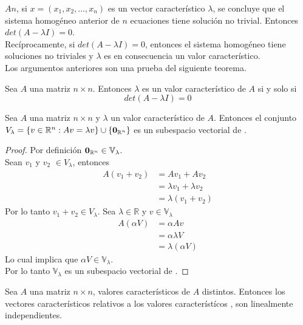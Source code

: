 \noindent $An$, si $x = (x_1 , x_2 , \ldots , x_n)$ es un vector característico $\lambda$, se concluye que el sistema homogéneo anterior de $n$ ecuaciones tiene solución no trivial. Entonces $det (A - \lambda I) = 0$.\\
Recíprocamente, si $det(A- \lambda I)=0$, entonces el sistema homogéneo tiene soluciones no triviales y $\lambda$ es en consecuencia un valor característico.\\
Los argumentos anteriores son una prueba del siguiente teorema.
\begin{theorem}
Sea $A$ una matriz $n \times n$. Entonces $\lambda$ es un valor característico de $A$ si y solo si 
$$det(A- \lambda I) =0$$
\end{theorem}


\begin{theorem}
Sea $A$ una matriz $n \times n$ y $\lambda$ un valor característico de $A$. Entonces el conjunto $V_{\lambda} = \{v \in \mathbb{R}^n : Av = \lambda v \} \cup  \{\mathbf{0}_{\mathbb{R}^n}\}$ es un subespacio vectorial de \rn .
\end{theorem}

\begin{proof}
Por definición $\mathbf{0}_{\mathbb{R}^n} \in \mathbb{V}_{\lambda}$.\\
Sean $v_1$ y $v_2$ $\in V_{\lambda}$, entonces 
\begin{align*}
A(v_1 + v_2) &= A v_1 + A v_2\\
&= \lambda v_1 + \lambda v_2\\
&= \lambda (v_1 + v_2)
\end{align*}
Por lo tanto $v_1 + v_2 \in V_{\lambda}$.
Sea $\lambda \in \mathbb{R}$ y $v \in \mathbb{V}_{\lambda}$
\begin{align*}
A(\alpha V) &= \alpha A v\\
&= \alpha \lambda V\\
&=\lambda (\alpha V)
\end{align*}
Lo cual implica que $\alpha V \in \mathbb{V}_{\lambda}$.\\
Por lo tanto $\mathbb{V}_{\lambda}$ es un subespacio vectorial de \rn .
\end{proof}


\begin{theorem}
Sea $A$ una matriz $n \times n$,  valores característicos de $A$ distintos. Entonces los vectores característicos  relativos a los valores característícos , son linealmente independientes.
\end{theorem}


